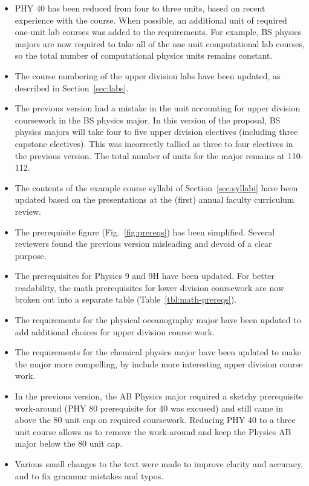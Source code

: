 \documentclass[12pt]{article}
\begin{document}
\begin{itemize}
  \item PHY 40 has been reduced from four to three units, based on
    recent experience with the course.  When possible, an additional
    unit of required one-unit lab courses was added to the
    requirements.  For example, BS physics majors are now required to
    take all of the one unit computational lab courses, so the total
    number of computational physics units remains constant.
 \item The course numbering of the upper division labs have been updated, as
   described in Section~\ref{sec:labs}.   
 \item The previous version had a mistake in the unit accounting for
   upper division coursework in the BS physics major.  In this
   version of the proposal, BS physics majors will take four to five
   upper division electives (including three capstone electives).
   This was incorrectly tallied as three to four electives in the
   previous version.  The total number of units for the major remains
   at 110-112.
 \item The contents of the example course syllabi of
   Section~\ref{sec:syllabi} have been updated based on the
   presentations at the (first) annual faculty curriculum review.
 \item The prerequisite figure (Fig.~\ref{fig:prereqs}) has been
   simplified.  Several reviewers found the previous version
   misleading and devoid of a clear purpose.   
 \item The prerequisites for Physics 9 and 9H have been updated.  For
   better readability, the math prerequisites for lower division
   coursework are now broken out into a separate table (Table~\ref{tbl:math-prereqs}).
 \item The requirements for the physical oceanography major have been
   updated to add additional choices for upper division course work. 
 \item The requirements for the chemical physics major have been
   updated to make the major more compelling, by include more
   interesting upper division course work.
 \item In the previous version, the AB Physics major required a
   sketchy prerequisite work-around (PHY 80 prerequisite for 40 was
   excused) and still came in above the 80 unit cap on required
   coursework.  Reducing PHY 40 to a three unit course allows us to
   remove the work-around and keep the Physics AB major below the 80
   unit cap.
 \item Various small changes to the text were made to improve clarity
   and accuracy, and to fix grammar mistakes and typos.
\end{itemize}
\vskip 3cm
\tableofcontents
\end{document}
